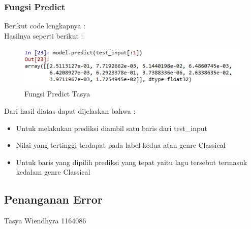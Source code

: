 \subsubsection{Fungsi Predict}
Berikut code lengkapnya : \\

Hasilnya seperti berikut : \\
\begin{figure}[ht]
\centering
\includegraphics[scale=0.5]{figures/chapter6tasya22.png}
\caption{Fungsi Predict Tasya}
\label{Praktek}
\end{figure}
Dari hasil diatas dapat dijelaskan bahwa :\\
\begin{itemize}
\item Untuk melakukan prediksi diambil satu baris dari test\_input
\item Nilai yang tertinggi terdapat pada label kedua atau genre Classical
\item Untuk baris yang dipilih prediksi yang tepat yaitu lagu tersebut termasuk kedalam genre Classical
\end{itemize}

\subsection{Penanganan Error}
Tasya Wiendhyra 1164086
